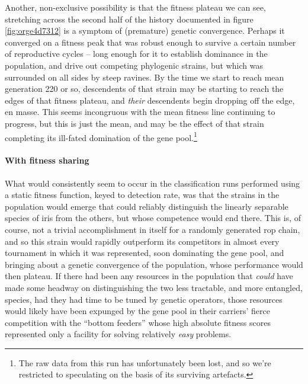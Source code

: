 \documentclass[12pt,glossary]{dalthesis}
\begin{document}
Another, non-exclusive possibility is that the fitness plateau we can see,
stretching across the second half of the history documented in figure
\ref{fig:orge4d7312} is a symptom of (premature) genetic convergence. 
Perhaps it converged on a fitness peak that was robust enough to survive
a certain number of reproductive cycles -- long enough for it to establish
dominance in the population, and drive out competing phylogenic strains, but 
which was surrounded on all sides by steep ravines. By the time we start to reach
mean generation 220 or so, descendents of that strain may be starting to reach
the edges of that fitness plateau, and \emph{their} descendents begin dropping off the
edge, en masse. This seems incongruous with the mean fitness line continuing to
progress, but this is just the mean, and may be the effect of that strain completing
its ill-fated domination of the gene pool.\footnote{The raw data from this run has unfortunately been lost, and so we're restricted
  to speculating on the basis of its surviving artefacts.}

\paragraph{With fitness sharing}
\label{sec:org31597bc}
\label{orgeb2af69}

 What would consistently seem to occur in the classification runs performed
 using a static fitness function, keyed to detection rate, was that the
 strains in the population would emerge that could reliably distinguish the
 linearly separable species of iris from the others, but whose competence
 would end there. This is, of course, not a trivial accomplishment in itself
 for a randomly generated \gls{rop} chain, and so this strain would rapidly
 outperform its competitors in almost every tournament in which it was
 represented, soon dominating the gene pool, and bringing about a genetic
 convergence of the population, whose performance would then plateau. If there
 had been any resources in the population that \emph{could} have made some headway
 on distinguishing the two less tractable, and more entangled, species, had
they had time to be tuned by genetic operators, those resources would likely
have been expunged by the gene pool in their carriers' fierce competition with
the ``bottom feeders'' whose high absolute fitness scores represented only a
facility for solving relatively \emph{easy} problems.
\end{document}

